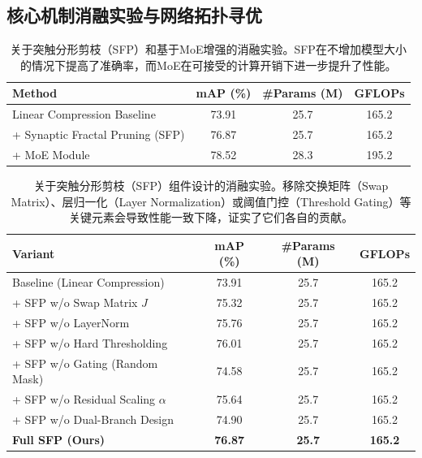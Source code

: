 \subsection{核心机制消融实验与网络拓扑寻优}

\begin{table}[htbp]
\centering
\caption{关于突触分形剪枝（SFP）和基于MoE增强的消融实验。SFP在不增加模型大小的情况下提高了准确率，而MoE在可接受的计算开销下进一步提升了性能。}
\label{tab:ablation_sfp_moe}
\begin{tabular}{l c c c}
\toprule
Method & mAP (\%) & \#Params (M) & GFLOPs \\
\midrule
Linear Compression Baseline      & 73.91 & 25.7 & 165.2 \\
+ Synaptic Fractal Pruning (SFP) & 76.87 & 25.7 & 165.2 \\
+ MoE Module                     & 78.52 & 28.3 & 195.2 \\
\bottomrule
\end{tabular}
\end{table}

\begin{table}[htbp]
\centering
\caption{关于突触分形剪枝（SFP）组件设计的消融实验。移除交换矩阵（Swap Matrix）、层归一化（Layer Normalization）或阈值门控（Threshold Gating）等关键元素会导致性能一致下降，证实了它们各自的贡献。}
\label{tab:ablation_sfp_components}
\begin{tabular}{l c c c}
\toprule
Variant & mAP (\%) & \#Params (M) & GFLOPs \\
\midrule
Baseline (Linear Compression)       & 73.91 & 25.7 & 165.2 \\
+ SFP w/o Swap Matrix $J$           & 75.32 & 25.7 & 165.2 \\
+ SFP w/o LayerNorm                 & 75.76 & 25.7 & 165.2 \\
+ SFP w/o Hard Thresholding         & 76.01 & 25.7 & 165.2 \\
+ SFP w/o Gating (Random Mask)      & 74.58 & 25.7 & 165.2 \\
+ SFP w/o Residual Scaling $\alpha$ & 75.64 & 25.7 & 165.2 \\
+ SFP w/o Dual-Branch Design        & 74.90 & 25.7 & 165.2 \\
\textbf{Full SFP (Ours)}            & \textbf{76.87} & \textbf{25.7} & \textbf{165.2} \\
\bottomrule
\end{tabular}
\end{table}

